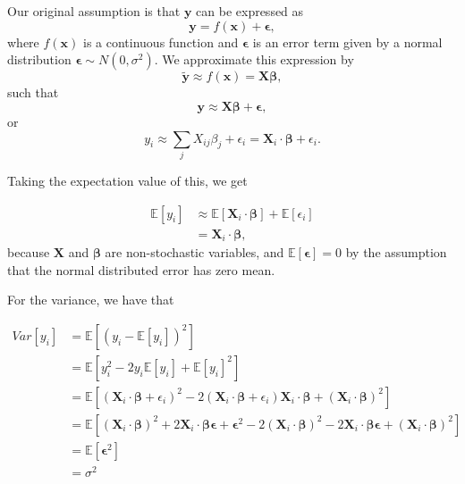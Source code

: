 \documentclass[12pt]{article}
\begin{document}
Our original assumption is that $\mathbf{y}$ can be expressed as 
\begin{equation}
    \mathbf{y} = f(\boldsymbol{x}) + \boldsymbol{\epsilon},
\end{equation}
where $f(\boldsymbol{x})$ is a continuous function and $\boldsymbol{\epsilon}$ is an error term given by a normal distribution $\boldsymbol{\epsilon} \sim N\left(0, \sigma^2\right)$. We approximate this expression by 
\begin{equation}\label{eq:reg_approx}
    \tilde{\mathbf{y}} \approx f(\boldsymbol{x}) = \mathbf{X} \boldsymbol{\beta},
\end{equation}
such that 
\begin{equation}
    \mathbf{y} \approx \mathbf{X} \boldsymbol{\beta} + \boldsymbol{\epsilon},
\end{equation}
or
\begin{equation}
    y_i \approx \sum_{j} X_{ij} \beta_{j} + \epsilon_i =\mathbf{X}_i \cdot \boldsymbol{\beta} + \epsilon_i.
\end{equation}

Taking the expectation value of this, we get

\begin{align}
    \mathbb{E} \left[y_i \right] &\approx \mathbb{E} \left[ \mathbf{X}_i \cdot \boldsymbol{\beta}\right] + \mathbb{E} \left[\epsilon_i\right] \nonumber\nonumber \\
    &= \mathbf{X}_i \cdot \boldsymbol{\beta},
\end{align}
because $\mathbf{X}$ and $\boldsymbol{\beta}$ are non-stochastic variables, and $\mathbb{E} \left[\boldsymbol{\epsilon}\right] = 0$ by the assumption that the normal distributed error has zero mean.

For the variance, we have that

\begin{align}
    Var \left[y_i\right] &= \mathbb{E} \left[ \left( y_i - \mathbb{E} \left[y_i \right] \right)^2\right] \nonumber\nonumber \\
    &= \mathbb{E} \left[y_i^2 - 2y_i\mathbb{E}\left[y_i\right] + \mathbb{E}\left[y_i\right]^2\right] \nonumber\nonumber \\
    &= \mathbb{E} \left[\left(\mathbf{X}_i \cdot \boldsymbol{\beta} + \epsilon_i\right)^2 - 2\left(\mathbf{X}_i \cdot \boldsymbol{\beta} + \epsilon_i\right)\mathbf{X}_i \cdot \boldsymbol{\beta} + \left(\mathbf{X}_i \cdot \boldsymbol{\beta}\right)^2\right] \nonumber\nonumber \\
    &= \mathbb{E} \left[\left(\mathbf{X}_i \cdot \boldsymbol{\beta}\right)^2 + 2\mathbf{X}_i \cdot \boldsymbol{\beta}\boldsymbol{\epsilon} + \boldsymbol{\epsilon}^2 - 2\left(\mathbf{X}_i \cdot \boldsymbol{\beta}\right)^2 - 2\mathbf{X}_i \cdot \boldsymbol{\beta} \boldsymbol{\epsilon} + \left(\mathbf{X}_i \cdot \boldsymbol{\beta}\right)^2\right] \nonumber\nonumber \\
    &= \mathbb{E} \left[\boldsymbol{\epsilon}^2\right] \nonumber\nonumber \\
    &= \sigma^2
\end{align}
\end{document}
